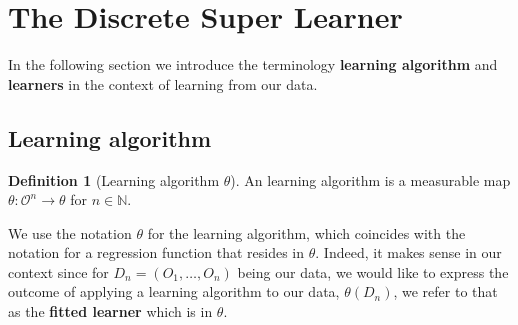 \documentclass[11pt, a4paper]{article}
\theoremstyle{definition}
\newtheorem{definition}[theorem]{Definition}
\theoremstyle{remark}
\newcommand{\btheta}{\theta}
\begin{document}


\section{The Discrete Super Learner}

In the following section we introduce the terminology \textbf{learning algorithm} and \textbf{learners} in the context of learning from our data.  

\subsection{Learning algorithm}
\begin{definition}[Learning algorithm $ \btheta $]
    An learning algorithm is a measurable map $ \btheta : \mathcal{O}^{n} \to \btheta $ for $ n \in \mathbb{N} $. 
\end{definition}

We use the notation $ \btheta $ for the learning algorithm, which coincides with the notation for a regression function that resides in $ \btheta $. Indeed, it makes sense in our context since for $ D_n = (O_1 , \dots , O_n) $ being our data, we would like to express the outcome of applying a learning algorithm to our data, $\btheta(D_n) $, we refer to that as the \textbf{fitted learner} which is in $ \btheta $.  
\end{document}
